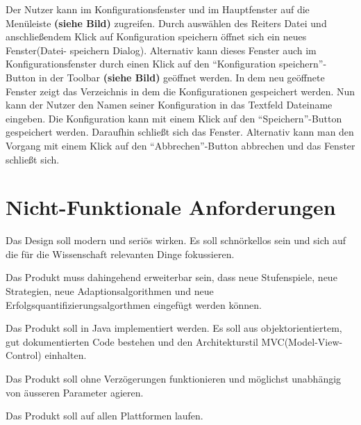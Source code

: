 \documentclass[parskip=full,11pt,twoside]{scrartcl}
\begin{document}

Der Nutzer kann im Konfigurationsfenster und im Hauptfenster auf die Menüleiste \textbf{(siehe Bild)} zugreifen. Durch auswählen des Reiters Datei und anschließendem Klick auf Konfiguration speichern öffnet sich ein neues Fenster(Datei- speichern Dialog). Alternativ kann dieses Fenster auch im Konfigurationsfenster durch einen Klick auf den \enquote{Konfiguration speichern}-Button in der Toolbar \textbf{(siehe Bild)} geöffnet werden. In dem neu geöffnete Fenster zeigt das Verzeichnis in dem die Konfigurationen gespeichert werden. Nun kann der Nutzer den Namen seiner Konfiguration in das Textfeld Dateiname eingeben. Die Konfiguration kann mit einem Klick auf den \enquote{Speichern}-Button gespeichert werden. Daraufhin schließt sich das Fenster. Alternativ kann man den Vorgang mit einem Klick auf den \enquote{Abbrechen}-Button abbrechen und das Fenster schließt sich.

\section{Nicht-Funktionale Anforderungen}


Das Design soll modern und seriös wirken. Es soll schnörkellos sein und sich auf die für die Wissenschaft relevanten Dinge fokussieren.


Das Produkt muss dahingehend erweiterbar sein,
dass neue Stufenspiele, neue Strategien, neue Adaptionsalgorithmen und neue Erfolgsquantifizierungsalgorthmen eingefügt werden können.


Das Produkt soll in Java implementiert werden. Es soll aus objektorientiertem, gut dokumentierten Code bestehen und den Architekturstil MVC(Model-View-Control) einhalten.


Das Produkt soll ohne Verzögerungen funktionieren und möglichst unabhängig von äusseren Parameter agieren.


Das Produkt soll auf allen Plattformen laufen.
\end{document}
